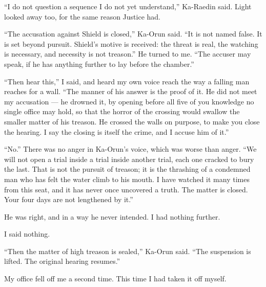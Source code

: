 ``I do not question a sequence I do not yet understand,'' Ka-Raedin said. Light looked away too, for the same reason Justice had.\par
 
``The accusation against Shield is closed,'' Ka-Orun said. ``It is not named false. It is set beyond pursuit. Shield's motive is received: the threat is real, the watching is necessary, and necessity is not treason.'' He turned to me. ``The accuser may speak, if he has anything further to lay before the chamber.''\par
 
``Then hear this,'' I said, and heard my own voice reach the way a falling man reaches for a wall. ``The manner of his answer is the proof of it. He did not meet my accusation --- he drowned it, by opening before all five of you knowledge no single office may hold, so that the horror of the crossing would swallow the smaller matter of his treason. He crossed the walls on purpose, to make you close the hearing. I say the closing is itself the crime, and I accuse him of it.''\par

``No.'' There was no anger in Ka-Orun's voice, which was worse than anger. ``We will not open a trial inside a trial inside another trial, each one cracked to bury the last. That is not the pursuit of treason; it is the thrashing of a condemned man who has felt the water climb to his mouth. I have watched it many times from this seat, and it has never once uncovered a truth. The matter is closed. Your four days are not lengthened by it.''\par

He was right, and in a way he never intended. I had nothing further.\par
 
I said nothing.\par
 
``Then the matter of high treason is sealed,'' Ka-Orun said. ``The suspension is lifted. The original hearing resumes.''\par
 
My office fell off me a second time. This time I had taken it off myself.\par
 
\ornament

